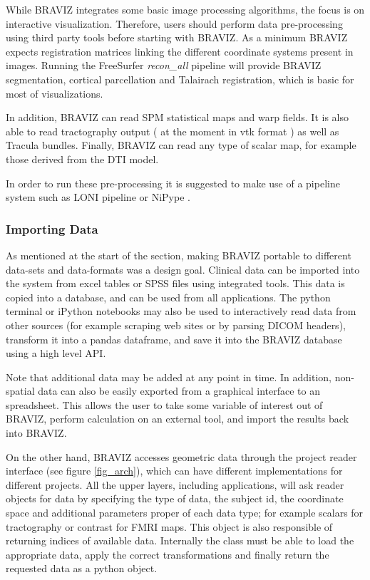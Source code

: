 \documentclass[twocolumn]{svjour3}
\begin{document}
While BRAVIZ integrates some basic image processing algorithms, the focus is on interactive visualization. Therefore, users should perform data pre-processing using third party tools before starting with BRAVIZ. As a minimum BRAVIZ expects registration matrices linking the different coordinate systems present in images. Running the FreeSurfer \emph{recon_all} pipeline will provide BRAVIZ segmentation, cortical parcellation and Talairach registration, which is basic for most of visualizations. 

In addition, BRAVIZ can read SPM statistical maps and warp fields. It is also able to read tractography output ( at the moment in vtk format ) as well as Tracula bundles. Finally, BRAVIZ can read any type of scalar map, for example those derived from the DTI model.

In order to run these pre-processing it is suggested to make use of a pipeline system such as LONI pipeline \cite{} or NiPype \cite{}.

\subsubsection{Importing Data}


As mentioned at the start of the section, making BRAVIZ portable to different data-sets and data-formats was a design goal. Clinical data can be imported into the system from excel tables or SPSS files using integrated tools. This data is copied into a database, and can be used from all applications. The python terminal or iPython notebooks \cite{} may also be used to interactively read data from other sources (for example scraping web sites or by parsing DICOM headers), transform it into a pandas dataframe, and save it into the BRAVIZ database using a high level API.

Note that additional data may be added at any point in time. In addition, non-spatial data can also be easily exported from a graphical interface to an spreadsheet. This allows the user to take some variable of interest out of BRAVIZ, perform calculation on an external tool, and import the results back into BRAVIZ.

On the other hand, BRAVIZ accesses geometric data through the project reader interface (see figure \ref{fig_arch}), which can have different implementations for different projects. All the upper layers, including applications, will ask reader objects for data by specifying the type of data, the subject id, the coordinate space  and additional parameters proper of each data type; for example scalars for tractography or contrast for FMRI maps. This object is also responsible of returning indices of available data. Internally the class must be able to load the appropriate data, apply the correct transformations and finally return the requested data as a python object. 
\end{document}
